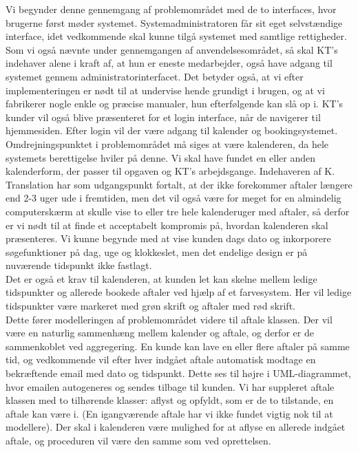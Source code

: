 \documentclass[12pt]{article}   %
\begin{document}
Vi begynder denne gennemgang af problemområdet med de to interfaces, hvor
brugerne først møder systemet. Systemadministratoren får sit eget selvstændige
interface, idet vedkommende skal kunne tilgå systemet med samtlige
rettigheder. Som vi også nævnte under gennemgangen af anvendelsesområdet, så
skal KT's indehaver alene i kraft af, at hun er eneste medarbejder, også have
adgang til systemet gennem administratorinterfacet. Det betyder også, at vi efter
implementeringen er nødt til at undervise hende grundigt i brugen, og at vi
fabrikerer nogle enkle og præcise manualer, hun efterfølgende kan slå op i.
KT's kunder vil også blive præsenteret for et login interface, når de
navigerer til hjemmesiden. Efter login vil der være adgang til kalender og
bookingsystemet. \\
Omdrejningspunktet i problemområdet må siges at være kalenderen, da hele
systemets berettigelse hviler på denne. Vi skal have fundet en eller anden
kalenderform, der passer til opgaven og KT's arbejdsgange. Indehaveren af K.
Translation har som udgangspunkt fortalt, at der ikke forekommer aftaler længere
end 2-3 uger ude i fremtiden, men det vil også være for meget for en
almindelig computerskærm at skulle vise to eller tre hele kalenderuger med
aftaler, så derfor er vi nødt til at finde et acceptabelt kompromis på,
hvordan kalenderen skal præsenteres. Vi kunne begynde med at vise kunden dags 
dato og inkorporere søgefunktioner på dag, uge og klokkeslet, men det endelige
design er på nuværende tidspunkt ikke fastlagt.\\
Det er også et krav til kalenderen, at kunden let kan skelne mellem ledige
tidspunkter og allerede bookede aftaler ved hjælp af et farvesystem. Her vil
ledige tidspunkter være markeret med grøn skrift og aftaler med rød skrift. \\
Dette fører modelleringen af problemområdet videre til aftale klassen. Der vil 
være en naturlig sammenhæng mellem kalender og aftale, og derfor er de
sammenkoblet ved aggregering. En kunde kan lave en eller flere aftaler på
samme tid, og vedkommende vil efter hver indgået aftale automatisk modtage en 
bekræftende email med dato og tidspunkt. Dette ses til højre i UML-diagrammet,
hvor emailen autogeneres og sendes tilbage til kunden. Vi har suppleret aftale
klassen med to tilhørende klasser: aflyst og opfyldt, som er de to tilstande,
en aftale kan være i. (En igangværende aftale har vi ikke fundet vigtig nok
til at modellere). Der skal i kalenderen være mulighed for at aflyse en
allerede indgået aftale, og proceduren vil være den samme som ved oprettelsen.
\end{document}
